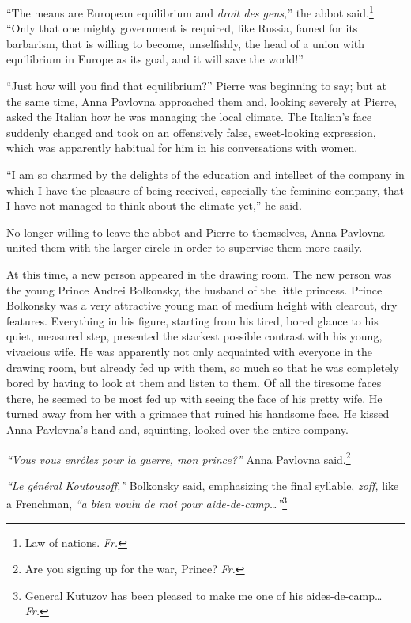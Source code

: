 ``The means are European equilibrium and \textit{droit des gens,}'' the abbot said.\footnote{Law of nations. \textit{Fr.}} ``Only that one mighty government is required, like Russia, famed for its barbarism, that is willing to become, unselfishly, the head of a union with equilibrium in Europe as its goal, and it will save the world!'' %

``Just how will you find that equilibrium?'' Pierre was beginning to say; but at the same time, Anna Pavlovna approached them and, looking severely at Pierre, asked the Italian how he was managing the local climate. The Italian's face suddenly changed and took on an offensively false, sweet-looking expression, which was apparently habitual for him in his conversations with women.

``I am so charmed by the delights of the education and intellect of the company in which I have the pleasure of being received, especially the feminine company, that I have not managed to think about the climate yet,'' he said. %

No longer willing to leave the abbot and Pierre to themselves, Anna Pavlovna united them with the larger circle in order to supervise them more easily.

At this time, a new person appeared in the drawing room. The new person was the young Prince Andrei Bolkonsky, the husband of the little princess. Prince Bolkonsky was a very attractive young man of medium height with clearcut, dry features. Everything in his figure, starting from his tired, bored glance to his quiet, measured step, presented the starkest possible contrast with his young, vivacious wife. He was apparently not only acquainted with everyone in the drawing room, but already fed up with them, so much so that he was completely bored by having to look at them and listen to them. Of all the tiresome faces there, he seemed to be most fed up with seeing the face of his pretty wife. He turned away from her with a grimace that ruined his handsome face. He kissed Anna Pavlovna's hand and, squinting, looked over the entire company.

\textit{``Vous vous enr\^olez pour la guerre, mon prince?''} Anna Pavlovna said.\footnote{Are you signing up for the war, Prince? \textit{Fr.}} %

\textit{``Le g\'en\'eral Koutouzoff,''} Bolkonsky said, emphasizing the final syllable, \textit{zoff,} like a Frenchman, \textit{``a bien voulu de moi pour aide-de-camp\ldots''}\footnote{General Kutuzov has been pleased to make me one of his aides-de-camp\ldots{} \textit{Fr.}} %

